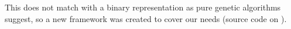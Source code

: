 \documentclass[sigconf]{acmart}
\begin{document}
This does not match with a binary 
representation as pure genetic algorithms suggest, so
a new framework was created to cover our needs (source code on 
 \cite{ab-level}).
\end{document}
